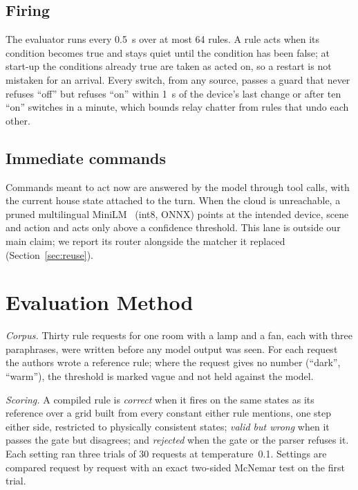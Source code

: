 \documentclass[conference]{IEEEtran}
\begin{document}
\subsection{Firing}
The evaluator runs every 0.5~s over at most 64 rules. A rule acts when its
condition becomes true and stays quiet until the condition has been false;
at start-up the conditions already true are taken as acted on, so a restart is
not mistaken for an arrival. Every switch, from any source, passes a guard that
never refuses ``off'' but refuses ``on'' within 1~s of the device's last change
or after ten ``on'' switches in a minute, which bounds relay chatter from rules
that undo each other.

\subsection{Immediate commands}
Commands meant to act now are answered by the model through tool calls, with
the current house state attached to the turn. When the cloud is unreachable, a
pruned multilingual MiniLM~\cite{minilm,multilingual} (int8, ONNX) points at
the intended device, scene and action and acts only above a confidence
threshold. This lane is outside our main claim; we report its router alongside
the matcher it replaced (Section~\ref{sec:reuse}).

\section{Evaluation Method}\label{sec:method}

\textit{Corpus.} Thirty rule requests for one room with a lamp and a fan, each
with three paraphrases, were written before any model output was seen. For
each request the authors wrote a reference rule; where the request gives no
number (``dark'', ``warm''), the threshold is marked vague and not held against
the model.

\textit{Scoring.} A compiled rule is \textit{correct} when it fires on the same
states as its reference over a grid built from every constant either rule
mentions, one step either side, restricted to physically consistent states;
\textit{valid but wrong} when it passes the gate but disagrees; and
\textit{rejected} when the gate or the parser refuses it. Each setting ran three
trials of 30 requests at temperature~0.1. Settings are compared request by
request with an exact two-sided McNemar test on the first trial.
\end{document}
